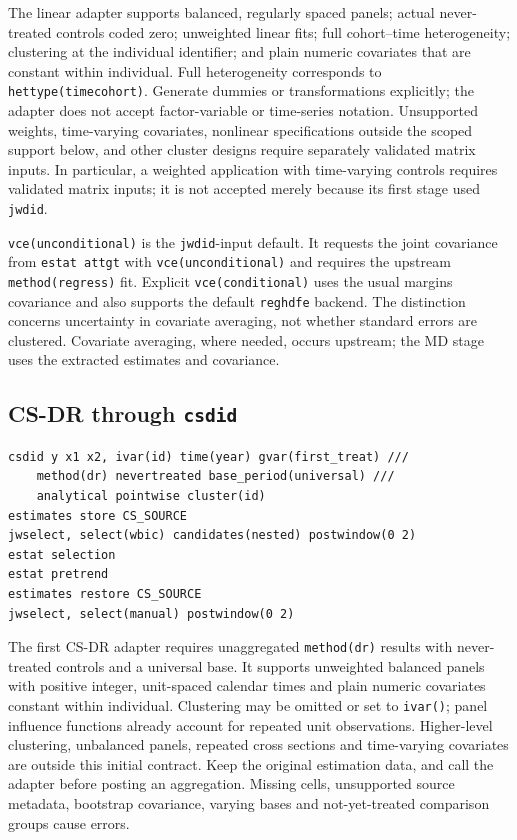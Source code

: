 \documentclass[11pt]{article}
\newcommand{\cmd}[1]{\texttt{#1}}
\begin{document}
The linear adapter supports balanced, regularly spaced panels; actual
never-treated controls coded zero; unweighted linear fits; full cohort--time
heterogeneity; clustering at the individual identifier; and plain numeric
covariates that are constant within individual. Full heterogeneity corresponds
to \cmd{hettype(timecohort)}. Generate dummies or transformations explicitly;
the adapter does not accept factor-variable or time-series notation. Unsupported weights,
time-varying covariates, nonlinear specifications outside the scoped support
below, and other cluster designs require separately validated matrix inputs. In particular, a weighted application with time-varying controls requires validated matrix
inputs; it is not accepted merely because its first stage used \cmd{jwdid}.

\cmd{vce(unconditional)} is the \cmd{jwdid}-input default. It requests the joint covariance from
\cmd{estat attgt} with \cmd{vce(unconditional)} and requires the upstream
\cmd{method(regress)} fit. Explicit \cmd{vce(conditional)} uses the usual
margins covariance and also supports the default \cmd{reghdfe} backend.
The distinction concerns uncertainty in covariate averaging, not whether
standard errors are clustered. Covariate averaging, where needed, occurs
upstream; the MD stage uses the extracted estimates and covariance.

\subsection{CS-DR through \texttt{csdid}}
\begin{lstlisting}
csdid y x1 x2, ivar(id) time(year) gvar(first_treat) ///
    method(dr) nevertreated base_period(universal) ///
    analytical pointwise cluster(id)
estimates store CS_SOURCE
jwselect, select(wbic) candidates(nested) postwindow(0 2)
estat selection
estat pretrend
estimates restore CS_SOURCE
jwselect, select(manual) postwindow(0 2)
\end{lstlisting}
The first CS-DR adapter requires unaggregated \cmd{method(dr)} results with
never-treated controls and a universal base. It supports unweighted balanced
panels with positive integer, unit-spaced calendar times and plain numeric
covariates constant within individual. Clustering may be omitted or set to
\cmd{ivar()}; panel influence functions already account for repeated unit
observations. Higher-level clustering, unbalanced panels, repeated cross
sections and time-varying covariates are outside this initial contract.
Keep the original estimation data, and call the adapter before posting an
aggregation. Missing cells, unsupported source metadata, bootstrap covariance,
varying bases and not-yet-treated comparison groups cause errors.
\end{document}
